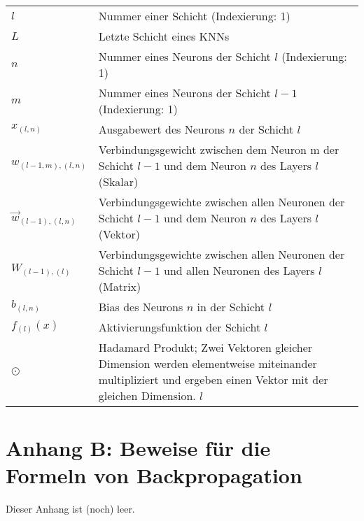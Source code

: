 \documentclass[a4paper,12pt,ngerman,oneside]{scrreprt}	%
\begin{document}
			\vspace{2mm}
			\newcommand{\newNotationRow}{\\[2.5mm]}
			\begin{tabular}{p{30mm}p{110mm}}
			\hline
			\centering\vspace{1mm} $l$ & \vspace{0mm} Nummer einer Schicht (Indexierung: 1)\newNotationRow	
			\centering $L$ & Letzte Schicht eines KNNs\newNotationRow
			\centering $n$ & Nummer eines Neurons der Schicht $l$ (Indexierung: 1)\newNotationRow
			\centering $m$ & Nummer eines Neurons der Schicht $l-1$ (Indexierung: 1)\newNotationRow %
			\centering $x_{(l,n)}$ & Ausgabewert des Neurons $n$ der Schicht $l$\newNotationRow
			\centering $w_{(l-1,m),(l,n)}$ & Verbindungsgewicht zwischen dem Neuron m der Schicht $l-1$ und dem Neuron $n$ des Layers $l$ (Skalar) \newNotationRow
			\centering $\vec{w}_{(l-1),(l,n)}$ & Verbindungsgewichte zwischen allen Neuronen der Schicht \mbox{$l-1$} und dem Neuron $n$ des Layers $l$ (Vektor) \newNotationRow
			\centering $W_{(l-1),(l)}$ & Verbindungsgewichte zwischen allen Neuronen der Schicht \mbox{$l-1$} und allen Neuronen des Layers $l$ (Matrix) \newNotationRow
			\centering $b_{(l,n)}$ & Bias des Neurons $n$ in der Schicht $l$ \newNotationRow
			\centering $f_{(l)}(x)$ & Aktivierungsfunktion der Schicht $l$\newNotationRow
			
			\centering $\odot$ & Hadamard Produkt; Zwei Vektoren gleicher Dimension werden elementweise miteinander multipliziert und ergeben einen Vektor mit der gleichen Dimension. $l$\newNotationRow
			\hline
			\end{tabular}


		\newpage
		\vspace*{2cm}	
		\section*{Anhang B: Beweise für die Formeln von Backpropagation}
			Dieser Anhang ist (noch) leer.

		\newpage
		\vspace*{2cm}
\end{document}
